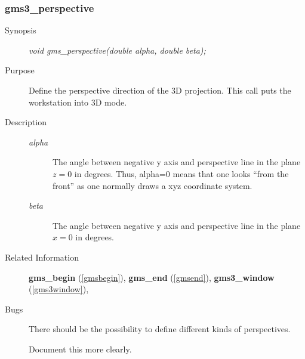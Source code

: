 \newpage



\subsubsection{gms3\_perspective\label{gms3perspective}}
\begin{description}
\item[Synopsis]\mbox{}


{\em  void    gms\_perspective(double alpha, double beta);\/}
\item[Purpose]\mbox{}


Define the perspective direction of the  3D projection.
This call puts the workstation into 3D mode.

\item[Description]\mbox{}


\begin{description}
\item[{\em alpha\/}]\mbox{}

 The angle between negative y axis and perspective line
in the plane $z=0$ in degrees. Thus, alpha=0 means that one
looks ``from the front'' as one normally draws a 
xyz coordinate system.
\item[{\em beta\/}]\mbox{}

 
The angle between negative y axis and perspective line
in the plane $x=0$ in degrees.
\end{description}

\item[Related Information]\mbox{}


{\bf gms\_begin} (\ref{gmsbegin}), 
{\bf gms\_end} (\ref{gmsend}), 
{\bf gms3\_window} (\ref{gms3window}), 
\item[Bugs]\mbox{}


There should be the possibility to define different kinds
of perspectives.
 
Document this more clearly.

\end{description}





\newpage



